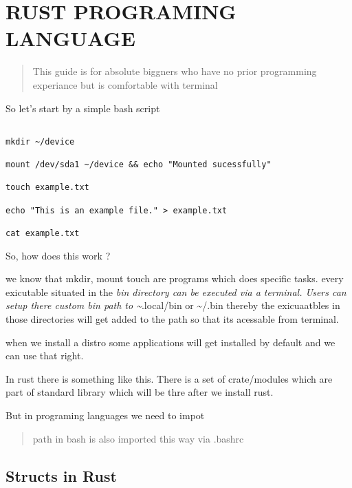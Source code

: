 \documentclass[11pt]{article}
\date{\today}
\title{}
\begin{document}
\tableofcontents



\section{RUST PROGRAMING LANGUAGE}
\label{sec:org6e434ca}

\begin{quote}


This guide is for absolute biggners who have no prior programming experiance but is comfortable with terminal
\end{quote}

So let's start by a simple bash script

\begin{verbatim}

mkdir ~/device

mount /dev/sda1 ~/device && echo "Mounted sucessfully"

touch example.txt

echo "This is an example file." > example.txt

cat example.txt

\end{verbatim}

So, how does this work ?

we know that mkdir, mount touch are programs which does specific tasks.
every exicutable situated in the \emph{bin directory can be executed via a terminal.
Users can setup there custom bin path to \textasciitilde{}}.local/bin or \textasciitilde{}/.bin thereby the exicuaatbles in those directories will get added to the path so that its acessable from terminal.

when we install a distro some applications will get installed by default and we can use that right.

In rust there is something like this. There is a set of crate/modules which are part of standard library which will be thre after we install rust.

But in programing languages we need to impot 

\begin{quote}


path in bash is also imported this way via .bashrc
\end{quote}

\subsection{Structs in Rust}
\label{sec:orgae6bb3f}
\end{document}
